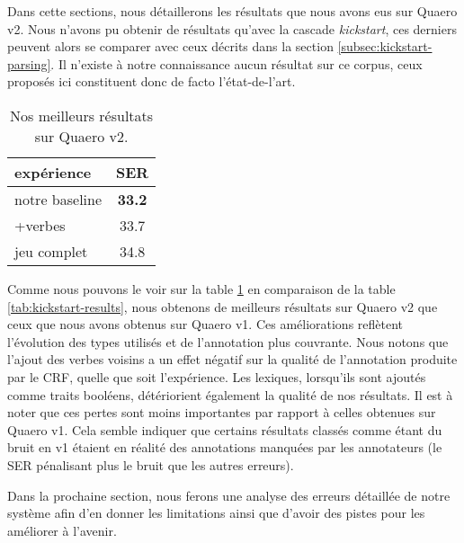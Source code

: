 \documentclass[PhD-Yoann-Dupont.tex]{subfiles}
\begin{document}
Dans cette sections, nous détaillerons les résultats que nous avons eus sur Quaero v2. Nous n'avons pu obtenir de résultats qu'avec la cascade \textit{kickstart}, ces derniers peuvent alors se comparer avec ceux décrits dans la section \ref{subsec:kickstart-parsing}. Il n'existe à notre connaissance aucun résultat sur ce corpus, ceux proposés ici constituent donc de facto l'état-de-l'art.

\begin{table}[ht!]
    \centering
    \begin{tabular}{|l|c|}
    \hline
    expérience     & SER \\
    \hline
    notre baseline & \textbf{33.2} \\
    +verbes        & 33.7 \\
    jeu complet    & 34.8 \\
    \hline
    \end{tabular}
    \caption{Nos meilleurs résultats sur Quaero v2.}
    \label{tab:quaero-v2-results}
\end{table}

Comme nous pouvons le voir sur la table \ref{tab:quaero-v2-results} en comparaison de la table \ref{tab:kickstart-results}, nous obtenons de meilleurs résultats sur Quaero v2 que ceux que nous avons obtenus sur Quaero v1. Ces améliorations reflètent l'évolution des types utilisés et de l'annotation plus couvrante. Nous notons que l'ajout des verbes voisins a un effet négatif sur la qualité de l'annotation produite par le CRF, quelle que soit l'expérience. Les lexiques, lorsqu'ils sont ajoutés comme traits booléens, détériorient également la qualité de nos résultats. Il est à noter que ces pertes sont moins importantes par rapport à celles obtenues sur Quaero v1. Cela semble indiquer que certains résultats classés comme étant du bruit en v1 étaient en réalité des annotations manquées par les annotateurs (le SER pénalisant plus le bruit que les autres erreurs).

Dans la prochaine section, nous ferons une analyse des erreurs détaillée de notre système afin d'en donner les limitations ainsi que d'avoir des pistes pour les améliorer à l'avenir.
\end{document}
